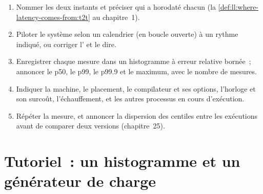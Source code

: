 \begin{method}\label{met:ll:measuring-latency:report}
\begin{enumerate}
\item Nommer les deux instants et préciser qui a horodaté chacun (la \cref{def:ll:where-latency-comes-from:t2t} au chapitre~1).
\item Piloter le système selon un calendrier (en boucle ouverte) à un rythme indiqué, ou corriger l' et le dire.
\item Enregistrer chaque mesure dans un histogramme à erreur relative bornée~; annoncer le p50, le p99, le p99.9 et le maximum, avec le
nombre de mesures.
\item Indiquer la machine, le placement, le compilateur et ses options, l'horloge et son surcoût, l'échauffement, et les autres processus en cours d'exécution.
\item Répéter la mesure, et annoncer la dispersion des centiles entre les exécutions avant de comparer deux versions (chapitre~25).
\end{enumerate}
\end{method}

\section{Tutoriel~: un histogramme et un générateur de charge}\label{tut:ll:measuring-latency:tut}

